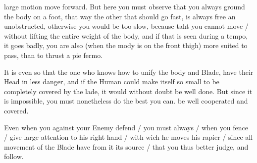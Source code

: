 \newpage


\newpage


large motion move forward. But here you must observe that you always
ground the body on a foot, that way the other that should go fast, is
always free an unobstructed, otherwise you would be too slow, because
taht you cannot move / without lifting the entire weight of the body,
and if that is seen during a tempo, it goes badly, you are also (when
the mody is on the front thigh) more suited to pass, than to thrust a
pie fermo.


It is even so that the one who knows how to unify the body and Blade,
have their Head in less danger, and if the Human could make itself so
small to be completely covered by the lade, it would without doubt be
well done. But since it is impossible, you must nonetheless do the
best you can. be well cooperated and covered.


Even when you against your Enemy defend / you must always / when you
fence / give large attention to his right hand / with wich he moves
his rapier / since all movement of the Blade have from it its source /
that you thus better judge, and follow.

